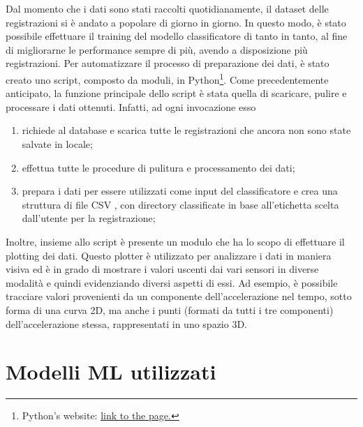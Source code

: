 Dal momento che i dati sono stati raccolti quotidianamente, il dataset delle registrazioni
si è andato a popolare di giorno in giorno. In questo modo, è stato possibile effettuare il 
training del modello classificatore di tanto in tanto, al fine di migliorarne le performance
\cite{impact_training_dataset_size}
sempre di più, avendo a disposizione più registrazioni. Per automatizzare il processo di 
preparazione dei dati, è stato creato uno script, composto da moduli, in Python\footnote{
Python's website: 
\href{https://www.python.org}{\underline{link to the page.}}}. Come
precedentemente anticipato, la funzione principale dello script è stata quella di scaricare,
pulire e processare i dati ottenuti. Infatti, ad ogni invocazione esso
\begin{enumerate}
    \item richiede al database e scarica tutte le registrazioni che ancora non sono state 
    salvate in locale;
    \item effettua tutte le procedure di pulitura e processamento dei dati;
    \item prepara i dati per essere utilizzati come input del classificatore e crea una 
    struttura di file CSV \cite{common_format_csv}, con directory classificate in 
    base all'etichetta scelta dall'utente per la registrazione;
\end{enumerate}
Inoltre, insieme allo script è presente un modulo che ha lo scopo di effettuare il plotting
dei dati. Questo plotter è utilizzato per analizzare i dati in maniera visiva ed è in
grado di mostrare i valori uscenti dai vari sensori in diverse modalità e quindi
evidenziando diversi aspetti di essi. Ad esempio, è possibile tracciare valori provenienti
da un componente dell'accelerazione nel tempo, sotto forma di una curva 2D, ma anche i 
punti (formati da tutti i tre componenti) dell'accelerazione stessa, rappresentati in uno 
spazio 3D.

\section{Modelli ML utilizzati} 

